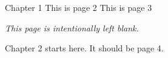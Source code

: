 \documentclass[12pt,twoside,openright]{report}
\makeatletter
\renewcommand{\cleardoublepage}{%
  \clearpage
  \if@twoside
    \ifodd\c@page\else
      \null
      \vspace*{\fill}
      \begin{center}
        \textit{This page is intentionally left blank.}
      \end{center}
      \vspace*{\fill}
      \thispagestyle{empty}
      \newpage
      \addtocounter{page}{-1}
    \fi
  \fi
}
\makeatother
\begin{document}
Chapter 1
\clearpage
This is page 2
\clearpage
This is page 3
\cleardoublepage
Chapter 2 starts here. It should be page 4.
\end{document}
